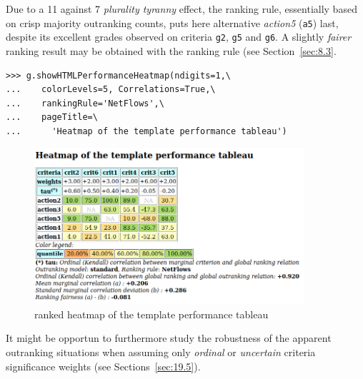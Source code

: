 Due to a 11 against 7 \emph{plurality tyranny} effect, the \Copeland ranking rule, essentially based on crisp majority outranking counts, puts here alternative \emph{action5} (\texttt{a5}) last, despite its excellent grades observed on criteria \texttt{g2}, \texttt{g5} and \texttt{g6}. A slightly \emph{fairer} ranking result may be obtained with the \NetFlows ranking rule (see Section~\vref{sec:8.3}.
\begin{lstlisting}
>>> g.showHTMLPerformanceHeatmap(ndigits=1,\
...    colorLevels=5, Correlations=True,\
...    rankingRule='NetFlows',\
...    pageTitle=\
...      'Heatmap of the template performance tableau')
\end{lstlisting}
\begin{figure}[h]
\includegraphics[width=10cm]{Figures/5-3-templateHeatmapNF.png}
\caption{\NetFlows ranked heatmap of the template performance tableau}
\label{fig:5.3}       %
\end{figure}

It might be opportun to furthermore study the robustness of the apparent outranking situations when assuming only \emph{ordinal} or \emph{uncertain} criteria significance weights (see Sections~\vref{sec:19.5}). 
 
\clearpage

\typeout{}

%